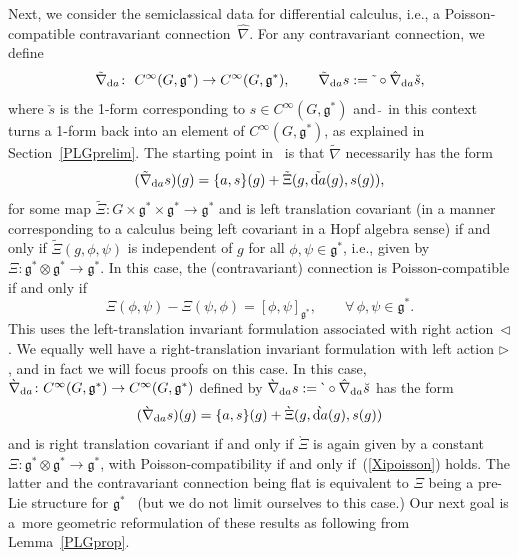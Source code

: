 \documentclass[10pt,a4paper]{amsart}
\numberwithin{equation}{section}
\newcommand{\<}{{\langle}}
\renewcommand{\>}{{\rangle}}
\newcommand{\tens}{\otimes}
\newcommand{\extd}{{\rm d}}
\newcommand{\la}{{\triangleright}}
\newcommand{\ra}{{\triangleleft}}
\newcommand{\cg}{{\mathfrak{g}}}
\newcommand{\tilder}{\grave}
\newcommand{\hatr}{\breve }
\newcommand{\hatl}{\check }
\begin{document}
Next, we consider the semiclassical data for differential calculus, i.e., a Poisson-compatible contravariant connection~$\hat\nabla$. For any contravariant connection, we define
\begin{equation*} \tilde{\nabla}_{\extd a}\colon \ C^\infty(G,\mathfrak{g}^*)\rightarrow C^\infty(G,\mathfrak{g}^*),\qquad \tilde{\nabla}_{\extd a}s:=\tilde{\ }\circ{\hat\nabla}_{\extd a}\hatl s,\end{equation*}
where $\hatl s$ is the 1-form corresponding to $s\in C^\infty(G,\cg^*)$ and $\tilde{\ }$ in this context turns a 1-form back into an element of $C^\infty(G,\cg^*)$, as explained in Section~\ref{PLGprelim}.
The starting point in~\cite{BegMa:sem} is that $\tilde\nabla$ necessarily has the form
\begin{equation}\label{mapXi}
(\tilde{\nabla}_{\extd a}s)(g)=\lbrace a,s\rbrace(g)+\tilde{\Xi}(g,\tilde{\extd a}(g),s(g)),
\end{equation}
for some map $\tilde\Xi\colon G\times\mathfrak{g}^*\times\mathfrak{g}^*\rightarrow\mathfrak{g}^*$ and is left translation covariant (in a manner corresponding to a calculus being left covariant in a Hopf algebra sense) if and only if $\tilde{\Xi}(g,\phi,\psi)$ is independent of $g$ for all $\phi,\psi\in\mathfrak{g}^*$, i.e., given by $\Xi\colon \cg^*\tens\cg^*\to \cg^*$. In this case, the (contravariant) connection is Poisson-compatible if and only if
\begin{equation}\label{Xipoisson} \Xi(\phi,\psi)-\Xi(\psi,\phi)=[\phi,\psi]_{\mathfrak{g}^*}, \qquad \forall\, \phi,\psi\in\mathfrak{g}^*.
\end{equation}
This uses the left-translation invariant formulation associated with right action~$\ra$. We equally well have a right-translation invariant formulation with left action $\la$, and in fact we will focus proofs on this case. In this case, $\tilder{\nabla}_{\extd a}\colon C^\infty(G,\mathfrak{g}^*)\rightarrow C^\infty(G,\mathfrak{g}^*)$ defined by $\tilder{\nabla}_{\extd a}s:=\tilder{\ }\circ{\hat\nabla}_{\extd a}\hatr s$ has the form
\begin{equation*}%
(\tilder{\nabla}_{\extd a}s)(g)=\lbrace a,s\rbrace(g)+\tilder{\Xi}(g,\tilder{\extd a}(g),s(g))
\end{equation*}
and is right translation covariant if and only if $\tilder\Xi$ is again given by a constant $\Xi\colon \cg^*\tens\cg^*\to \cg^*$, with Poisson-compatibility if and only if~(\ref{Xipoisson}) holds. The latter and the contravariant connection being flat is equivalent to $\Xi$ being a pre-Lie structure for $\cg^*$~\cite{MaTao:plg} (but we do not limit ourselves to this case.) Our next goal is a~more geometric reformulation of these results as following from Lemma~\ref{PLGprop}.
\end{document}

